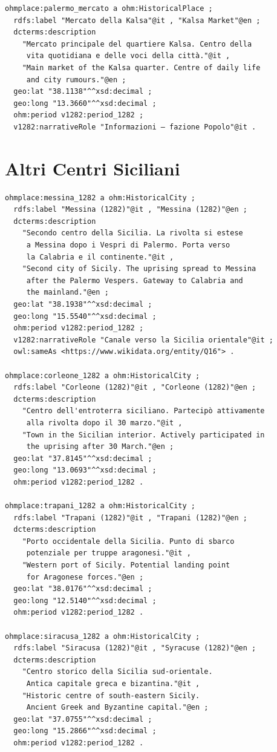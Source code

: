 \begin{verbatim}
ohmplace:palermo_mercato a ohm:HistoricalPlace ;
  rdfs:label "Mercato della Kalsa"@it , "Kalsa Market"@en ;
  dcterms:description
    "Mercato principale del quartiere Kalsa. Centro della
     vita quotidiana e delle voci della città."@it ,
    "Main market of the Kalsa quarter. Centre of daily life
     and city rumours."@en ;
  geo:lat "38.1138"^^xsd:decimal ;
  geo:long "13.3660"^^xsd:decimal ;
  ohm:period v1282:period_1282 ;
  v1282:narrativeRole "Informazioni — fazione Popolo"@it .
\end{verbatim}

\section{Altri Centri Siciliani}

\begin{verbatim}
ohmplace:messina_1282 a ohm:HistoricalCity ;
  rdfs:label "Messina (1282)"@it , "Messina (1282)"@en ;
  dcterms:description
    "Secondo centro della Sicilia. La rivolta si estese
     a Messina dopo i Vespri di Palermo. Porta verso
     la Calabria e il continente."@it ,
    "Second city of Sicily. The uprising spread to Messina
     after the Palermo Vespers. Gateway to Calabria and
     the mainland."@en ;
  geo:lat "38.1938"^^xsd:decimal ;
  geo:long "15.5540"^^xsd:decimal ;
  ohm:period v1282:period_1282 ;
  v1282:narrativeRole "Canale verso la Sicilia orientale"@it ;
  owl:sameAs <https://www.wikidata.org/entity/Q16"> .

ohmplace:corleone_1282 a ohm:HistoricalCity ;
  rdfs:label "Corleone (1282)"@it , "Corleone (1282)"@en ;
  dcterms:description
    "Centro dell'entroterra siciliano. Partecipò attivamente
     alla rivolta dopo il 30 marzo."@it ,
    "Town in the Sicilian interior. Actively participated in
     the uprising after 30 March."@en ;
  geo:lat "37.8145"^^xsd:decimal ;
  geo:long "13.0693"^^xsd:decimal ;
  ohm:period v1282:period_1282 .

ohmplace:trapani_1282 a ohm:HistoricalCity ;
  rdfs:label "Trapani (1282)"@it , "Trapani (1282)"@en ;
  dcterms:description
    "Porto occidentale della Sicilia. Punto di sbarco
     potenziale per truppe aragonesi."@it ,
    "Western port of Sicily. Potential landing point
     for Aragonese forces."@en ;
  geo:lat "38.0176"^^xsd:decimal ;
  geo:long "12.5140"^^xsd:decimal ;
  ohm:period v1282:period_1282 .

ohmplace:siracusa_1282 a ohm:HistoricalCity ;
  rdfs:label "Siracusa (1282)"@it , "Syracuse (1282)"@en ;
  dcterms:description
    "Centro storico della Sicilia sud-orientale.
     Antica capitale greca e bizantina."@it ,
    "Historic centre of south-eastern Sicily.
     Ancient Greek and Byzantine capital."@en ;
  geo:lat "37.0755"^^xsd:decimal ;
  geo:long "15.2866"^^xsd:decimal ;
  ohm:period v1282:period_1282 .


\end{verbatim}
